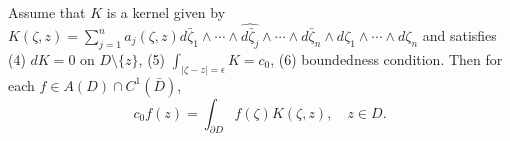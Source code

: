 
Assume that $K$ is a kernel given by $K(\zeta, z) = \sum_{j=1}^{n} a_j(\zeta, z) d\bar{\zeta}_1 \wedge \cdots \wedge \widehat{d\bar{\zeta}_j} \wedge \cdots \wedge d\bar{\zeta}_n \wedge d\zeta_1 \wedge \cdots \wedge d\zeta_n$ and satisfies (4) $dK = 0$ on $D \setminus \{z\}$, (5) $\int_{|\zeta-z|=\epsilon} K = c_0$, (6) boundedness condition. Then for each $f \in A(D) \cap C^1(\bar{D})$,
$$c_0 f(z) = \int_{\partial D} f(\zeta)K(\zeta, z), \quad z \in D.$$
